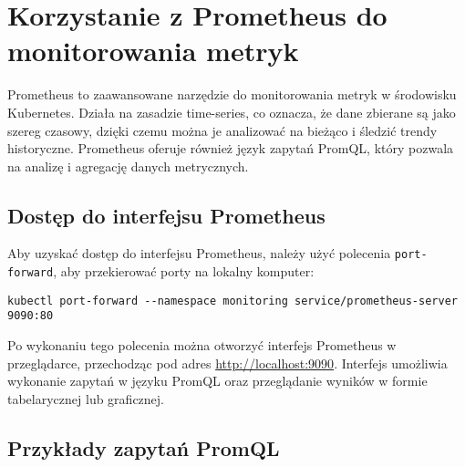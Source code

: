 \documentclass{article}
\begin{document}
\section{Korzystanie z Prometheus do monitorowania metryk}

Prometheus to zaawansowane narzędzie do monitorowania metryk w środowisku Kubernetes. Działa na zasadzie time-series, co oznacza, że dane zbierane są jako szereg czasowy, dzięki czemu można je analizować na bieżąco i śledzić trendy historyczne. Prometheus oferuje również język zapytań PromQL, który pozwala na analizę i agregację danych metrycznych.

\subsection{Dostęp do interfejsu Prometheus}

Aby uzyskać dostęp do interfejsu Prometheus, należy użyć polecenia \texttt{port-forward}, aby przekierować porty na lokalny komputer:

\begin{lstlisting}
kubectl port-forward --namespace monitoring service/prometheus-server 9090:80
\end{lstlisting}

Po wykonaniu tego polecenia można otworzyć interfejs Prometheus w przeglądarce, przechodząc pod adres \url{http://localhost:9090}. Interfejs umożliwia wykonanie zapytań w języku PromQL oraz przeglądanie wyników w formie tabelarycznej lub graficznej.

\subsection{Przykłady zapytań PromQL}
\end{document}
